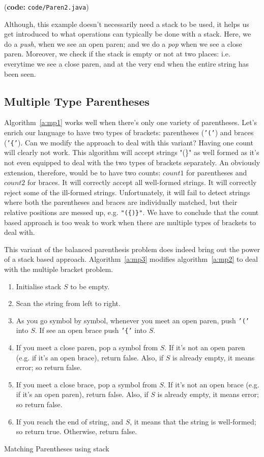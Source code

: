\documentclass[12pt,a4paper]{article}
\begin{document}
(\textbf{code:} \texttt{code/Paren2.java})

Although, this example doesn't necessarily need a stack to be used, it helps us get introduced to what operations can typically be done with a stack. Here, we do a \emph{push}, when we see an open paren; and we do a \emph{pop} when we see a close paren. Moreover, we check if the stack is empty or not at two places: i.e. everytime we see a close paren, and at the very end when the entire string has been seen.


\subsection{Multiple Type Parentheses}
Algorithm~\ref{a:mp1} works well when there's only one variety of parentheses. Let's enrich our language to have two types of brackets: parentheses (\texttt{'('}) and braces (\texttt{'\{'}). Can we modify the approach to deal with this variant? Having one count will clearly not work. This algorithm will accept strings "(\}" as well formed as it's not even equipped to deal with the two types of brackets separately. An obviously extension, therefore, would be to have two counts: $count1$ for parentheses and $count2$ for braces. It will correctly accept all well-formed strings. It will correctly reject some of the ill-formed strings. Unfortunately, it will fail to detect strings where both the parentheses and braces are individually matched, but their relative positions are messed up, e.g. \texttt{"(\{)\}"}. We have to conclude that the count based approach is too weak to work when there are multiple types of brackets to deal with.

This variant of the balanced parenthesis problem does indeed bring out the power of a stack based approach. Algorithm~\ref{a:mp3} modifies algorithm~\ref{a:mp2} to deal with the multiple bracket problem.


\begin{algorithm}
\begin{enumerate}
\item Initialise stack $S$ to be empty.
\item Scan the string from left to right.
\item As you go symbol by symbol, whenever you meet an open paren, push \texttt{'('} into $S$. If see an open brace push \texttt{'\{'} into $S$.
\item If you meet a close paren, pop a symbol from $S$. If it's not an open paren (e.g. if it's an open brace), return false. Also, if $S$ is already empty, it means error; so return false.
\item If you meet a close brace, pop a symbol from $S$. If it's not an open brace (e.g. if it's an open paren), return false. Also, if $S$ is already empty, it means error; so return false.
\item If you reach the end of string, and $S$, it means that the string is well-formed; so return true. Otherwise, return false. 
\end{enumerate}
\caption{Matching Parentheses using stack}
\label{a:mp3}
\end{algorithm}
\end{document}
